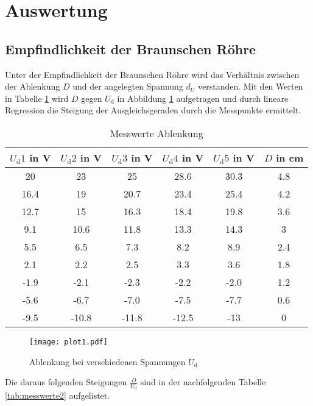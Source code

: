 \section{Auswertung}
\label{sec:Auswertung}

\subsection{Empfindlichkeit der Braunschen Röhre}
\label{sec:Empfindlichkeit}
Unter der Empfindlichkeit der Braunschen Röhre wird das Verhältnis zwischen der Ablenkung $D$ und der angelegten Spannung $d_U$ verstanden.
Mit den Werten in Tabelle \ref{tab:messwerte1} wird $D$ gegen $U_\text{d}$ in Abbildung \ref{fig:plot1} aufgetragen und durch lineare Regression die Steigung der Ausgleichsgeraden durch die Messpunkte ermittelt.

\FloatBarrier
\begin{table}
  \centering
  \caption{Messwerte Ablenkung}
  \label{tab:messwerte1}
  \begin{tabular}{c c c c c c}
  \toprule
  $U_\text{d} 1$ in V & $U_\text{d} 2$ in V & $U_\text{d} 3$ in V & $U_\text{d} 4$ in V & $U_\text{d} 5$ in V & $D$ in cm \\
  \midrule
  20 & 23 & 25 & 28.6 & 30.3 & 4.8 \\
  16.4 & 19 & 20.7 & 23.4 & 25.4 & 4.2 \\
  12.7 & 15 & 16.3 & 18.4 & 19.8 & 3.6 \\
  9.1 & 10.6 & 11.8 & 13.3 & 14.3 & 3 \\
  5.5 & 6.5 & 7.3 & 8.2 & 8.9 & 2.4 \\
  2.1 & 2.2 & 2.5 & 3.3 & 3.6 & 1.8 \\
  -1.9 & -2.1 & -2.3 & -2.2 & -2.0 & 1.2 \\
  -5.6 & -6.7 & -7.0 & -7.5 & -7.7 & 0.6 \\
  -9.5 & -10.8 & -11.8 & -12.5 & -13 & 0 \\
  \bottomrule
\end{tabular}
\end{table}

\FloatBarrier
\begin{figure}
  \centering
  \texttt{[image: plot1.pdf]}
  \caption{Ablenkung bei verschiedenen Spannungen $U_\text{d}$}
  \label{fig:plot1}
\end{figure}

\noindent
Die daraus folgenden Steigungen $\frac{D}{U_\text{d}}$ sind in der nachfolgenden Tabelle \ref{tab:messwerte2} aufgelistet.

